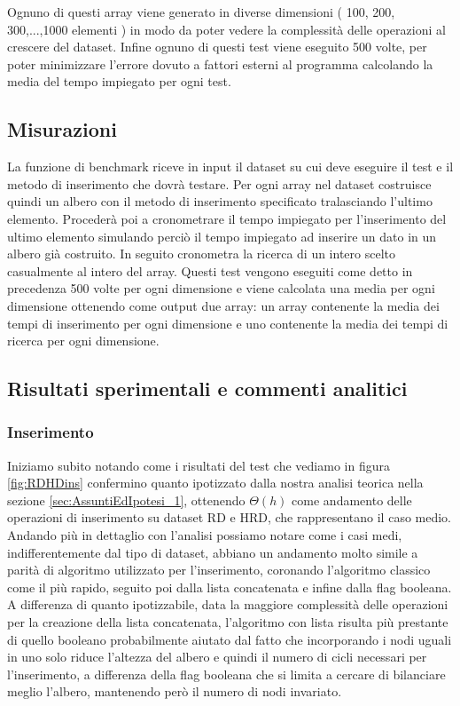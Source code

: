 Ognuno di questi array viene generato in diverse dimensioni ( 100, 200, 300,...,1000 elementi ) in modo da poter vedere la complessità delle operazioni 
al crescere del dataset.
Infine ognuno di questi test viene eseguito 500 volte, per poter minimizzare l'errore dovuto a fattori esterni al programma calcolando
la media del tempo impiegato per ogni test.

\subsection{Misurazioni}
\label{sec:Misurazioni_1}
La funzione di benchmark riceve in input il dataset su cui deve eseguire il test e il metodo di inserimento che dovrà
testare. Per ogni array nel dataset costruisce quindi un albero con il metodo di inserimento specificato tralasciando l'ultimo elemento.
Procederà poi a cronometrare il tempo impiegato per l'inserimento del ultimo elemento simulando perciò il tempo impiegato ad 
inserire un dato in un albero già costruito.
In seguito cronometra la ricerca di un intero scelto casualmente al intero del array.
Questi test vengono eseguiti come detto in precedenza 500 volte per ogni dimensione e viene calcolata una media per ogni dimensione ottenendo come output due array: un array contenente la media dei tempi di inserimento per ogni dimensione e uno contenente la media dei tempi di ricerca per ogni dimensione. 

\subsection{Risultati sperimentali e commenti analitici}
\label{sec:RisultatiSperimentaliCommentiAnalitici_1}

\subsubsection{Inserimento}
Iniziamo subito notando come i risultati del test che vediamo in figura \ref{fig:RDHDins} confermino quanto ipotizzato dalla nostra analisi teorica nella sezione \ref{sec:AssuntiEdIpotesi_1},
ottenendo $\Theta(h)$ come andamento delle operazioni di inserimento su dataset RD e HRD, che rappresentano il caso medio.
Andando più in dettaglio con l'analisi possiamo notare come i casi medi, indifferentemente dal tipo di dataset, abbiano un andamento molto simile a parità di
algoritmo utilizzato per l'inserimento, coronando l'algoritmo classico come il più rapido, seguito poi dalla lista concatenata e infine dalla flag booleana. 
A differenza di quanto ipotizzabile, data la maggiore complessità delle operazioni per la creazione della lista concatenata, l'algoritmo con lista
risulta più prestante di quello booleano probabilmente aiutato dal fatto che incorporando i nodi uguali in uno solo riduce l'altezza del albero e quindi il numero di 
cicli necessari per l'inserimento, a differenza della flag booleana che si limita a cercare di bilanciare meglio l'albero, mantenendo però il numero di nodi invariato.


